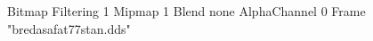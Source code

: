{Bitmap
	{Filtering 1}
	{Mipmap 1}
	{Blend none}
	{AlphaChannel 0}
	{Frame "bredasafat77stan.dds"}
}
